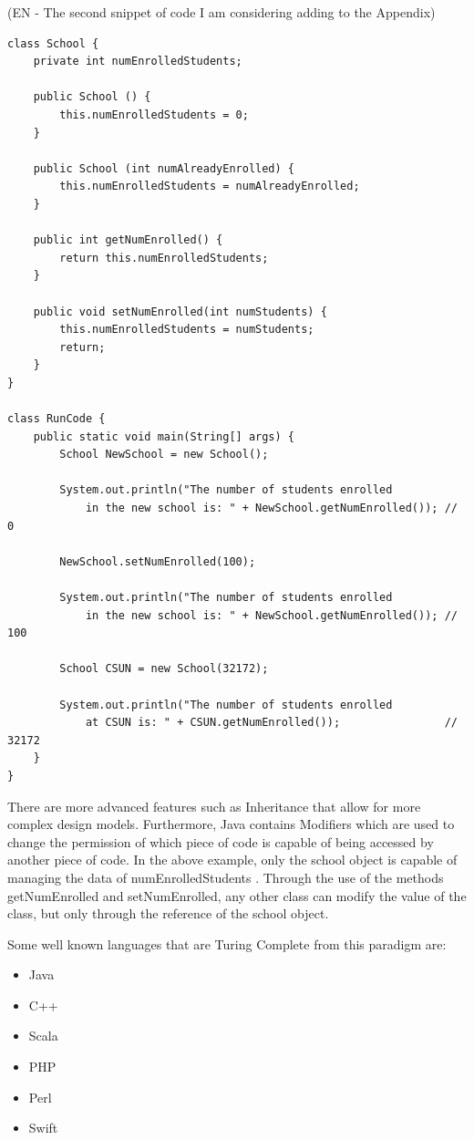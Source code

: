(EN - The second snippet of code I am considering adding to the Appendix)

\begin{verbatim}
class School {
    private int numEnrolledStudents;
    
    public School () {
        this.numEnrolledStudents = 0;
    }
    
    public School (int numAlreadyEnrolled) {
        this.numEnrolledStudents = numAlreadyEnrolled;
    }
    
    public int getNumEnrolled() {
        return this.numEnrolledStudents;
    }
    
    public void setNumEnrolled(int numStudents) {
        this.numEnrolledStudents = numStudents;
        return;
    }
}

class RunCode {
    public static void main(String[] args) {
        School NewSchool = new School();
        
        System.out.println("The number of students enrolled 
            in the new school is: " + NewSchool.getNumEnrolled()); // 0
        
        NewSchool.setNumEnrolled(100);
        
        System.out.println("The number of students enrolled
            in the new school is: " + NewSchool.getNumEnrolled()); // 100
        
        School CSUN = new School(32172);
        
        System.out.println("The number of students enrolled
            at CSUN is: " + CSUN.getNumEnrolled());                // 32172
    }
}
\end{verbatim}

There are more advanced features such as Inheritance that allow for more complex design models.
Furthermore, Java contains Modifiers which are used to change the permission of which piece of code is capable of being accessed by another piece of code.
In the above example, only the school object is capable of managing the data of numEnrolledStudents \cite{CSUNStudents}.
Through the use of the methods getNumEnrolled and setNumEnrolled, any other class can modify the value of the class, but only through the reference of the school object.

Some well known languages that are Turing Complete from this paradigm are: 
\begin{itemize}
    \item Java
    \item C++
    \item Scala
    \item PHP
    \item Perl
    \item Swift        
\end{itemize}

